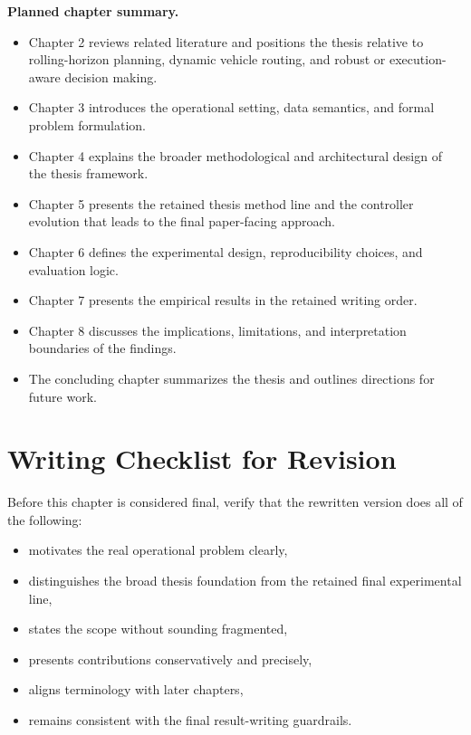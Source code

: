 \textbf{Planned chapter summary.}
\begin{itemize}
    \item Chapter 2 reviews related literature and positions the thesis relative to rolling-horizon planning, dynamic vehicle routing, and robust or execution-aware decision making.
    \item Chapter 3 introduces the operational setting, data semantics, and formal problem formulation.
    \item Chapter 4 explains the broader methodological and architectural design of the thesis framework.
    \item Chapter 5 presents the retained thesis method line and the controller evolution that leads to the final paper-facing approach.
    \item Chapter 6 defines the experimental design, reproducibility choices, and evaluation logic.
    \item Chapter 7 presents the empirical results in the retained writing order.
    \item Chapter 8 discusses the implications, limitations, and interpretation boundaries of the findings.
    \item The concluding chapter summarizes the thesis and outlines directions for future work.
\end{itemize}

\section{Writing Checklist for Revision}
\label{sec:intro:checklist}

Before this chapter is considered final, verify that the rewritten version does all of the following:
\begin{itemize}
    \item motivates the real operational problem clearly,
    \item distinguishes the broad thesis foundation from the retained final experimental line,
    \item states the scope without sounding fragmented,
    \item presents contributions conservatively and precisely,
    \item aligns terminology with later chapters,
    \item remains consistent with the final result-writing guardrails.
\end{itemize}

